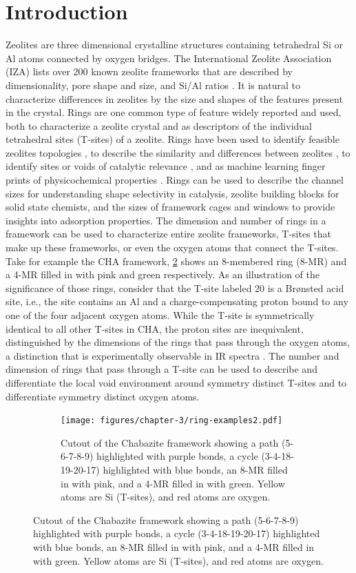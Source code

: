 \documentclass[preprint,numrefs,noinfo,sort&compress]{elsarticle}
\begin{document}
\section{Introduction}
\label{sec:org497996e}
Zeolites are three dimensional crystalline structures containing tetrahedral Si or Al atoms connected by oxygen bridges. The International Zeolite Association (IZA) lists over 200 known zeolite frameworks that are described by dimensionality, pore shape and size, and Si/Al ratios \cite{baerlocher-database-nodate}. It is natural to characterize differences in zeolites by the size and shapes of the features present in the crystal. Rings are one common type of feature widely reported and used, both to characterize a zeolite crystal and as descriptors of the individual tetrahedral sites (T-sites) of a zeolite. Rings have been used to identify feasible zeolites topologies \cite{li-why-2014}, to describe the similarity and differences between zeolites \cite{curtis-statistical-2003,bermudez-calculation-2017}, to identify sites or voids of catalytic relevance \cite{li-first-principles-2018,kester-effects-2021}, and as machine learning finger prints of physicochemical properties \cite{helfrecht-new-2019}. Rings can be used to describe the channel sizes for understanding shape selectivity in catalysis, zeolite building blocks for solid state chemists, and the sizes of framework cages and windows to provide insights into adsorption properties. The dimension and number of rings in a framework can be used to characterize entire zeolite frameworks, T-sites that make up these frameworks, or even the oxygen atoms that connect the T-sites. Take for example the CHA framework, \cref{fig:3.1} shows an 8-membered ring (8-MR) and a 4-MR filled in with pink and green respectively. As an illustration of the significance of those rings, consider that the T-site labeled 20 is a Br\o nsted acid site, i.e., the site contains an Al and a charge-compensating proton bound to any one of the four adjacent oxygen atoms. While the T-site is symmetrically identical to all other T-sites in CHA, the proton sites are inequivalent, distinguished by the dimensions of the rings that pass through the oxygen atoms, a distinction that is experimentally observable in IR spectra \cite{kester-effects-2021}. The number and dimension  of rings that pass through a T-site can be used to describe and differentiate the local void environment around symmetry distinct T-sites and to  differentiate symmetry distinct oxygen atoms. 

\begin{figure}
\begin{figure}[H]
\centering
\texttt{[image: figures/chapter-3/ring-examples2.pdf]}
\caption{Cutout of the Chabazite framework showing a path (5-6-7-8-9) highlighted with purple bonds, a cycle (3-4-18-19-20-17) highlighted with blue bonds, an 8-MR filled in with pink, and a 4-MR filled in with green. Yellow atoms are Si (T-sites), and red atoms are oxygen. \label{fig:3.1}}
\end{figure}
\end{figure}
\end{document}

